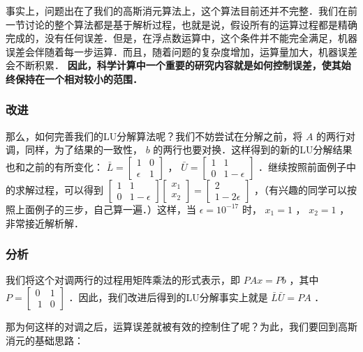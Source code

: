 事实上，问题出在了我们的高斯消元算法上，这个算法目前还并不完整．我们在前一节讨论的整个算法都是基于解析过程，也就是说，假设所有的运算过程都是精确完成的，没有任何误差．但是，在浮点数运算中，这个条件并不能完全满足，机器误差会伴随着每一步运算．而且，随着问题的复杂度增加，运算量加大，机器误差会不断积累． \textbf{因此，科学计算中一个重要的研究内容就是如何控制误差，使其始终保持在一个相对较小的范围．}

\subsubsection{改进}

那么，如何完善我们的LU分解算法呢？我们不妨尝试在分解之前，将  $A$  的两行对调，同样，为了结果的一致性，  $b $  的两行也要对换．这样得到的新的LU分解结果也和之前的有所变化：  $\bar{L}=\begin{bmatrix} 1& 0\\ {\epsilon} & 1 \end{bmatrix}$  ，  $\bar{U}=\begin{bmatrix} 1& 1\\ 0 & 1-{\epsilon} \end{bmatrix}$  ．继续按照前面例子中的求解过程，可以得到  $\begin{bmatrix} 1& 1\\ 0 &1-{\epsilon}  \end{bmatrix} \begin{bmatrix} x_1\\ x_2 \end{bmatrix}= \begin{bmatrix} 2\\ 1-2{\epsilon} \end{bmatrix}$  ，（有兴趣的同学可以按照上面例子的三步，自己算一遍．）这样，当  $\epsilon=10^{-17}$  时，  $x_1=1$  ，  $x_2=1$  ，非常接近解析解．

\subsubsection{分析}

我们将这个对调两行的过程用矩阵乘法的形式表示，即  $PAx=Pb$  ，其中  $P=\begin{bmatrix} 0&1\\\ 1&0 \end{bmatrix}$  ．因此，我们改进后得到的LU分解事实上就是  $\bar{L}\bar{U}=PA$  ．

那为何这样的对调之后，运算误差就被有效的控制住了呢？为此，我们要回到高斯消元的基础思路：

